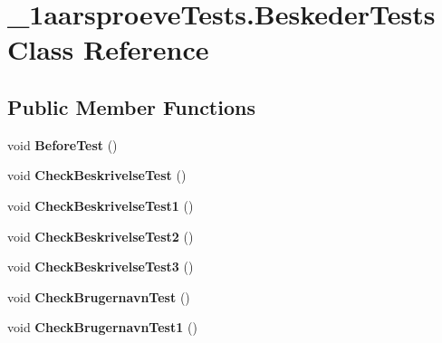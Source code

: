 \hypertarget{class__1aarsproeve_tests_1_1_beskeder_tests}{}\section{\+\_\+1aarsproeve\+Tests.\+Beskeder\+Tests Class Reference}
\label{class__1aarsproeve_tests_1_1_beskeder_tests}
\subsection*{Public Member Functions}
\begin{DoxyCompactItemize}
\item 
\hypertarget{class__1aarsproeve_tests_1_1_beskeder_tests_a776cf61b3ba30a23d81b45b8b3a8bb16}{}void {\bfseries Before\+Test} ()\label{class__1aarsproeve_tests_1_1_beskeder_tests_a776cf61b3ba30a23d81b45b8b3a8bb16}

\item 
\hypertarget{class__1aarsproeve_tests_1_1_beskeder_tests_ad8b21a2660bf697e9c9de677b2bbf0b2}{}void {\bfseries Check\+Beskrivelse\+Test} ()\label{class__1aarsproeve_tests_1_1_beskeder_tests_ad8b21a2660bf697e9c9de677b2bbf0b2}

\item 
\hypertarget{class__1aarsproeve_tests_1_1_beskeder_tests_a6395cf468a8710a0e8fff9c917a46955}{}void {\bfseries Check\+Beskrivelse\+Test1} ()\label{class__1aarsproeve_tests_1_1_beskeder_tests_a6395cf468a8710a0e8fff9c917a46955}

\item 
\hypertarget{class__1aarsproeve_tests_1_1_beskeder_tests_a1b6964f1eba00f29782962d1e3429de6}{}void {\bfseries Check\+Beskrivelse\+Test2} ()\label{class__1aarsproeve_tests_1_1_beskeder_tests_a1b6964f1eba00f29782962d1e3429de6}

\item 
\hypertarget{class__1aarsproeve_tests_1_1_beskeder_tests_a221c18ee3ade362f2b40063dc7f7ebcb}{}void {\bfseries Check\+Beskrivelse\+Test3} ()\label{class__1aarsproeve_tests_1_1_beskeder_tests_a221c18ee3ade362f2b40063dc7f7ebcb}

\item 
\hypertarget{class__1aarsproeve_tests_1_1_beskeder_tests_a82ebe5a34a90753eca52830583786a9b}{}void {\bfseries Check\+Brugernavn\+Test} ()\label{class__1aarsproeve_tests_1_1_beskeder_tests_a82ebe5a34a90753eca52830583786a9b}

\item 
\hypertarget{class__1aarsproeve_tests_1_1_beskeder_tests_ae2d9ebd3354683c7d606e18b760ceaea}{}void {\bfseries Check\+Brugernavn\+Test1} ()\label{class__1aarsproeve_tests_1_1_beskeder_tests_ae2d9ebd3354683c7d606e18b760ceaea}


\end{DoxyCompactItemize}
